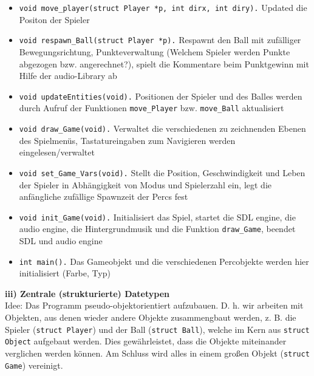 \documentclass[a4paper, 10pt]{article}
\begin{document}
\begin{itemize}
\item \texttt{void move\_player(struct Player *p, int dirx, int diry).} Updated die Positon der Spieler
\item \texttt{void respawn\_Ball(struct Player *p).} Respawnt den Ball mit zufälliger Bewegungsrichtung, Punkteverwaltung (Welchem Spieler werden Punkte abgezogen bzw. angerechnet?), spielt die Kommentare beim Punktgewinn mit Hilfe der audio-Library ab
\item \texttt{void updateEntities(void).} Positionen der Spieler und des Balles werden durch Aufruf der Funktionen \texttt{move\_Player} bzw. \texttt{move\_Ball} aktualisiert
\item \texttt{void draw\_Game(void).} Verwaltet die verschiedenen zu zeichnenden Ebenen des  Spielmenüs, Tastatureingaben zum Navigieren werden eingelesen/verwaltet
\item \texttt{void set\_Game\_Vars(void).} Stellt die Position, Geschwindigkeit und Leben der Spieler in Abhängigkeit von Modus und Spielerzahl ein, legt die anfängliche zufällige Spawnzeit der Percs fest
\item \texttt{void init\_Game(void).} Initialisiert das Spiel, startet die SDL engine, die audio engine, die Hintergrundmusik und die Funktion \texttt{draw\_Game}, beendet SDL und audio engine
\item \texttt{int main().} Das Gameobjekt und die verschiedenen Percobjekte werden hier initialisiert (Farbe, Typ)
\end{itemize}
\medskip
{\bf iii) Zentrale (strukturierte) Datetypen}\medskip\\
Idee: Das Programm pseudo-objektorientiert aufzubauen. D. h. wir arbeiten mit Objekten, aus denen wieder andere Objekte zusammengbaut werden, z. B. die Spieler (\texttt{struct Player}) und der Ball (\texttt{struct Ball}), welche im Kern aus \texttt{struct Object} aufgebaut werden. Dies gewährleistet, dass die Objekte miteinander verglichen werden können. Am Schluss wird alles in einem großen Objekt (\texttt{struct Game}) vereinigt.
\end{document}
